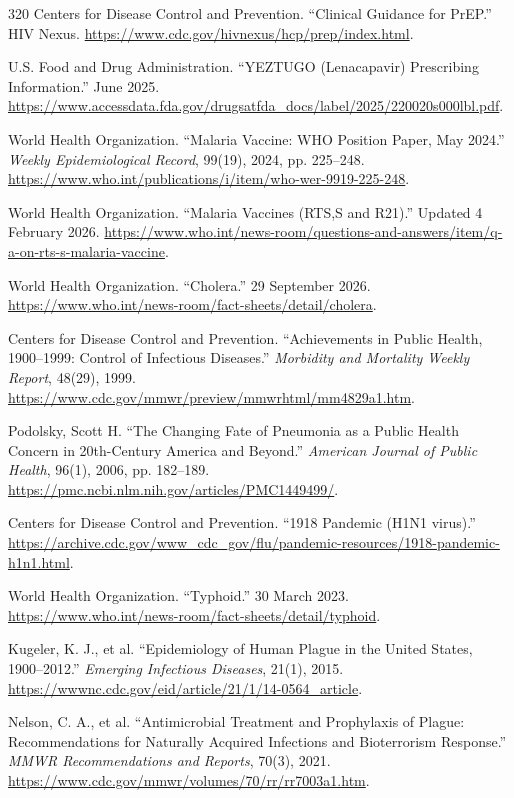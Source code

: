 \documentclass[12pt,oneside]{book}
\begin{document}
\begin{thebibliography}{320}
Centers for Disease Control and Prevention. ``Clinical Guidance for PrEP.''
HIV Nexus. \url{https://www.cdc.gov/hivnexus/hcp/prep/index.html}.

U.S. Food and Drug Administration. ``YEZTUGO (Lenacapavir) Prescribing
Information.'' June 2025.
\url{https://www.accessdata.fda.gov/drugsatfda_docs/label/2025/220020s000lbl.pdf}.

World Health Organization. ``Malaria Vaccine: WHO Position Paper, May 2024.''
\emph{Weekly Epidemiological Record}, 99(19), 2024, pp. 225--248.
\url{https://www.who.int/publications/i/item/who-wer-9919-225-248}.

World Health Organization. ``Malaria Vaccines (RTS,S and R21).'' Updated
4 February 2026.
\url{https://www.who.int/news-room/questions-and-answers/item/q-a-on-rts-s-malaria-vaccine}.

World Health Organization. ``Cholera.'' 29 September 2026.
\url{https://www.who.int/news-room/fact-sheets/detail/cholera}.

Centers for Disease Control and Prevention. ``Achievements in Public Health,
1900--1999: Control of Infectious Diseases.'' \emph{Morbidity and Mortality
Weekly Report}, 48(29), 1999.
\url{https://www.cdc.gov/mmwr/preview/mmwrhtml/mm4829a1.htm}.

Podolsky, Scott H. ``The Changing Fate of Pneumonia as a Public Health Concern
in 20th-Century America and Beyond.'' \emph{American Journal of Public
Health}, 96(1), 2006, pp. 182--189.
\url{https://pmc.ncbi.nlm.nih.gov/articles/PMC1449499/}.

Centers for Disease Control and Prevention. ``1918 Pandemic (H1N1 virus).''
\url{https://archive.cdc.gov/www_cdc_gov/flu/pandemic-resources/1918-pandemic-h1n1.html}.

World Health Organization. ``Typhoid.'' 30 March 2023.
\url{https://www.who.int/news-room/fact-sheets/detail/typhoid}.

Kugeler, K. J., et al. ``Epidemiology of Human Plague in the United States,
1900--2012.'' \emph{Emerging Infectious Diseases}, 21(1), 2015.
\url{https://wwwnc.cdc.gov/eid/article/21/1/14-0564_article}.

Nelson, C. A., et al. ``Antimicrobial Treatment and Prophylaxis of Plague:
Recommendations for Naturally Acquired Infections and Bioterrorism Response.''
\emph{MMWR Recommendations and Reports}, 70(3), 2021.
\url{https://www.cdc.gov/mmwr/volumes/70/rr/rr7003a1.htm}.


\end{thebibliography}
\end{document}
